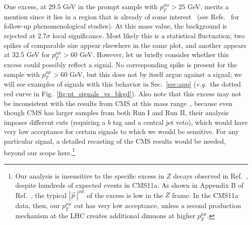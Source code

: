 \documentclass[aps,prd,twocolumn,superscriptaddress,preprintnumbers,nofootinbib,longbibliography,floatfix]{revtex4-1}
\newcommand{\ptmm}{p_T^{\mu\mu}}
\DeclareRobustCommand{\Sec}[1]{Sec.~\ref{#1}}
\DeclareRobustCommand{\Fig}[1]{Fig.~\ref{#1}}
\DeclareRobustCommand{\Ref}[1]{Ref.~\cite{#1}}
\DeclareRobustCommand{\Refs}[1]{Refs.~\cite{#1}}
\begin{document}
One excess, at 29.5 GeV in the prompt sample with $\ptmm>25$ GeV, merits a mention since it lies in a region that is already of some interest~\cite{Heister:2016stz,Sirunyan:2018wim} (see \Refs{Godunov:2018qsu,vanBeveren:2018hnp} for follow-up phenomenological studies).
%
At this mass value, the background is rejected at $2.7\sigma$ local significance.
%
Most likely this is a statistical fluctuation; two spikes of comparable size appear elsewhere in the same plot, and another appears at 32.5 GeV for $\ptmm>60$ GeV.
%
However, let us briefly consider whether this excess could possibly reflect a signal.
%
No corresponding spike is present for the sample with $\ptmm>60$ GeV, but this does not by itself argue against a signal; we will see examples of signals with this behavior in \Sec{sec:app} ({\it e.g.}\ the dotted red curve in \Fig{fig:pt_signals_vs_bkgd}).  
%
Also note that this excess may not be inconsistent with the results from CMS at this mass range~\cite{Sirunyan:2018wim}, because even though CMS has larger samples from both Run I and Run II, their analysis imposes different cuts (requiring a $b$ tag and a central jet veto), which would have very low acceptance for certain signals to which we would be sensitive.
%
For any particular signal, a detailed recasting of the CMS results would be needed, beyond our scope here.\footnote{Our analysis is insensitive to the specific excess in $Z$ decays observed in \Ref{Heister:2016stz}, despite hundreds of expected events in CMS11a.
%
As shown in Appendix B of \Ref{Heister:2016stz}, the typical $|\vec p\,|^{\mu\mu}$ of the excess is low in the $Z$ frame.
%
In the CMS11a data, then, our $\ptmm$ cut has very low acceptance, unless a second production mechanism at the LHC creates additional dimuons at higher $\ptmm$.} 
\end{document}
